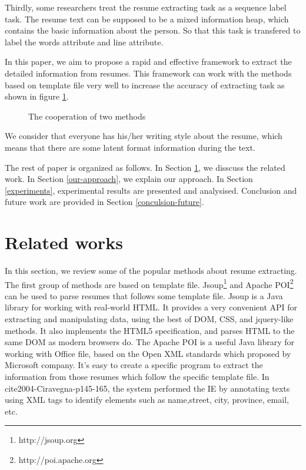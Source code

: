 \documentclass{acm_proc_article-sp}
\begin{document}
Thirdly, some researchers treat the resume extracting task as a sequence label task.
The resume text can be supposed to be a mixed information heap, which contains the basic information about the person.
So that this task is transfered to label the words attribute and line attribute.

In this paper, we aim to propose a rapid and effective framework to extract the detailed information from resumes. 
This framework can work with the methods based on template file very well to increase the accuracy of extracting task as shown in figure \ref{cooperation}.

\begin{figure}\label{cooperation}
\centering
{}
\caption{The cooperation of two methods}
\end{figure}


We consider that everyone has his/her writing style about the resume, which means that there are some latent format information during the text.

The rest of paper is organized as follows. In Section \ref{related-works}, we disscuss the related work. In Section \ref{our-approach}, we explain our approach. In Section \ref{experiments}, experimental results are presented and analysised. Conclusion and future work are provided in Section \ref{conculsion-future}.

\section{Related works}\label{related-works}

In this section, we review some of the popular methods about resume extracting.
The first group of methods are based  on template file.
Jsoup\footnote{http://jsoup.org} and Apache POI\footnote{http://poi.apache.org} can be used to parse resumes that follows some template file.
Jsoup is a Java library for working with real-world HTML. 
It provides a very convenient API for extracting and manipulating data, using the best of DOM, CSS, and jquery-like methods.
It also implements the HTML5 specification, and parses HTML to the same DOM as modern browsers do.
The Apache POI is a useful Java library for working with Office file, based on the Open XML standards which proposed by Microsoft company.
It's easy to create a specific program to extract the information from those resumes which follow the specific template file.
In cite{2004-Ciravegna-p145-165}, the system performed the IE by annotating texts using XML tags to identify elements such as name,street, city, province, email, etc.
\end{document}
